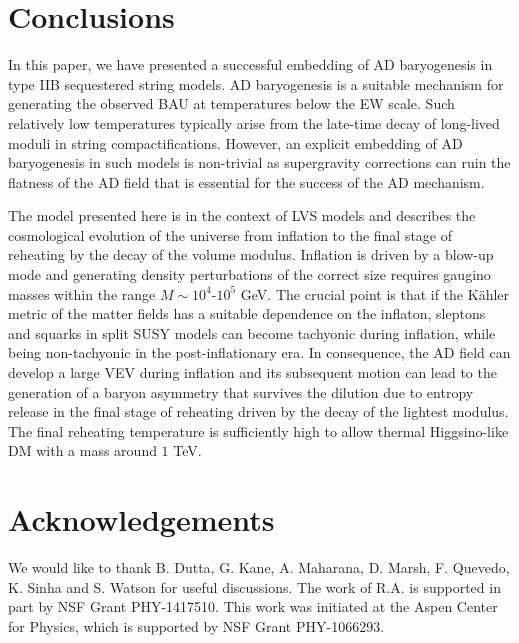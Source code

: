 \documentclass[11pt,a4paper]{article}
\begin{document}
\section{Conclusions}
\label{Concl}

In this paper, we have presented a successful embedding of AD baryogenesis in type IIB sequestered string models. AD baryogenesis is a suitable mechanism for generating the observed BAU at temperatures below the EW scale. Such relatively low temperatures typically arise from the late-time decay of long-lived moduli in string compactifications. However, an explicit embedding of AD baryogenesis in such models is non-trivial as supergravity corrections can ruin the flatness of the AD field that is essential for the success of the AD mechanism.

The model presented here is in the context of LVS models and describes the cosmological evolution of the universe from inflation to the final stage of reheating by the decay of the volume modulus. Inflation is driven by a blow-up mode and generating density perturbations of the correct size requires gaugino masses within the range $M \sim 10^4$-$10^5$ GeV. The crucial point is that if the K\"ahler metric of the matter fields has a suitable dependence on the inflaton, sleptons and squarks in split SUSY models can become tachyonic during inflation, while being non-tachyonic in the post-inflationary era. In consequence, the AD field can develop a large VEV during inflation and its subsequent motion can lead to the generation of a baryon asymmetry that survives the dilution due to entropy release in the final stage of reheating driven by the decay of the lightest modulus. The final reheating temperature is sufficiently high to allow thermal Higgsino-like DM with a mass around $1$ TeV. 
   

\section*{Acknowledgements}

We would like to thank B. Dutta, G. Kane, A. Maharana, D. Marsh, F. Quevedo, K. Sinha and S. Watson for useful discussions. The work of R.A. is supported in part by NSF Grant PHY-1417510. This work was initiated at the Aspen Center for Physics, which is supported by NSF Grant PHY-1066293.
\end{document}
